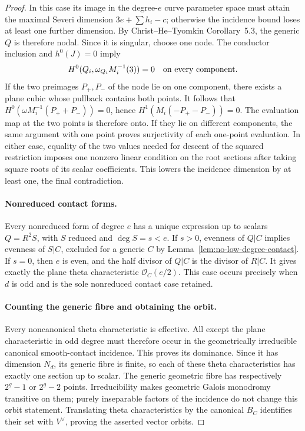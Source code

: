 \begin{proof}
In this case its image in the degree-$e$ curve parameter space
must attain the maximal Severi dimension
$3e+\sum h_i-c$; otherwise the incidence bound loses at least
one further dimension.  By Christ--He--Tyomkin Corollary~5.3,
the generic $Q$ is therefore nodal.  Since it is singular, choose
one node.  The conductor inclusion and $h^0(J)=0$ imply
\[
 H^0(Q_i,\omega_{Q_i}M_i^{-1}(3))=0
 \quad\hbox{on every component}.
\]
If the two preimages $P_+,P_-$ of the node lie on one component,
there exists a plane cubic whose pullback contains both points.
It follows that
$H^0(\omega M_i^{-1}(P_++P_-))=0$, hence
$H^1(M_i(-P_+-P_-))=0$.  The evaluation map at the two points
is therefore onto.  If they lie on different components, the
same argument with one point proves surjectivity of each
one-point evaluation.  In either case, equality of the two values
needed for descent of the squared restriction imposes one
nonzero linear condition on the root sections after taking square
roots of its scalar coefficients.  This lowers the incidence
dimension by at least one, the final contradiction.

\paragraph{Nonreduced contact forms.}
Every nonreduced form of degree $e$ has a unique expression up to
scalars $Q=R^2S$, with $S$ reduced and $\deg S=s<e$.
If $s>0$, evenness of $Q|C$ implies evenness of $S|C$, excluded
for a generic $C$ by Lemma~\ref{lem:no-low-degree-contact}.
If $s=0$, then $e$ is even, and the half divisor of $Q|C$ is
the divisor of $R|C$.  It gives exactly the plane theta
characteristic $\mathcal O_C(e/2)$.  This case occurs precisely
when $d$ is odd and is the sole nonreduced contact case retained.

\paragraph{Counting the generic fibre and obtaining the orbit.}
Every noncanonical theta characteristic is effective.
All except the plane characteristic in odd degree must therefore
occur in the geometrically irreducible canonical smooth-contact
incidence.  This proves its dominance.  Since it has dimension
$N_d$, its generic fibre is finite, so each of these theta
characteristics has exactly one section up to scalar.
The generic geometric fibre has respectively $2^g-1$ or
$2^g-2$ points.  Irreducibility makes geometric Galois monodromy
transitive on them; purely inseparable factors of the incidence
do not change this orbit statement.  Translating theta
characteristics by the canonical $B_C$ identifies their set
with $V^\vee$, proving the asserted vector orbits.
\end{proof}
